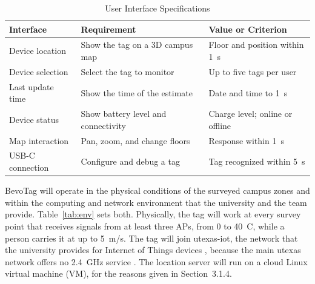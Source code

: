 \documentclass[12pt,letterpaper]{article}
\newenvironment{spectable}{\setstretch{1.0}\renewcommand{\arraystretch}{1.1}}{}
\begin{document}
\begin{table}[!htb]
\caption{User Interface Specifications}
\label{tab:ui}
\centering
\begin{spectable}
\begin{tabularx}{\linewidth}{@{}L{1.4in} Y L{2.4in}@{}}
\toprule
\textbf{Interface} & \textbf{Requirement} & \textbf{Value or Criterion} \\
\midrule
Device location & Show the tag on a 3D campus map & Floor and position within 1~s \\
Device selection & Select the tag to monitor & Up to five tags per user \\
Last update time & Show the time of the estimate & Date and time to 1~s \\
Device status & Show battery level and connectivity & Charge level; online or offline \\
Map interaction & Pan, zoom, and change floors & Response within 1~s \\
USB-C connection & Configure and debug a tag & Tag recognized within 5~s \\
\bottomrule
\end{tabularx}
\end{spectable}
\end{table}

BevoTag will operate in the physical conditions of the surveyed campus zones and within the computing
and network environment that the university and the team provide. Table~\ref{tab:env} sets both.
Physically, the tag will work at every survey point that receives signals from at least three APs,
from 0 to 40~\textdegree C, while a person carries it at up to 5~m/s. The tag will join utexas-iot,
the network that the university provides for Internet of Things devices \cite{utiot}, because the
main utexas network offers no 2.4~GHz service \cite{utwifi}. The location server will run on a cloud
Linux virtual machine (VM), for the reasons given in Section~3.1.4.
\end{document}

